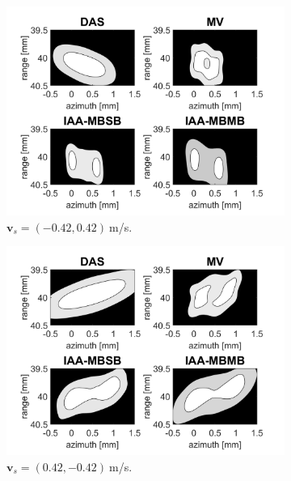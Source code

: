 \begin{figure}[ht]
\begin{subfigure}[t]{0.48\linewidth}
        \includegraphics[width=\linewidth]{./images/results/2.2/motion_-45_-06.png}
        \caption{$\boldsymbol{v}_s = (-0.42, 0.42)~$m/s.}
    \end{subfigure}
    \quad
    \begin{subfigure}[t]{0.48\linewidth}
        \includegraphics[width=\linewidth]{./images/results/2.2/motion_-45_06.png}
        \caption{$\boldsymbol{v}_s = (0.42, -0.42)~$m/s.}
    \end{subfigure}
    \quad
    \begin{subfigure}[t]{0.48\linewidth}

\end{subfigure}
\end{figure}
